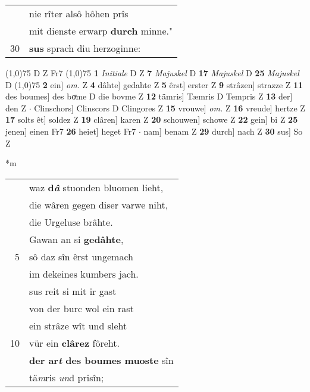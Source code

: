 \documentclass[8pt,a4paper,notitlepage]{article}
\begin{document}
\begin{table}[ht]
\begin{minipage}[t]{0.5\linewidth}
\begin{tabular}{rl}
 & nie rîter alsô hôhen prîs\\ 
 & mit dienste erwarp \textbf{durch} minne."\\ 
30 & \textbf{sus} sprach diu herzoginne:\\ 
\end{tabular}
\scriptsize
\line(1,0){75} \newline
D Z Fr7 \newline
\line(1,0){75} \newline
\textbf{1} \textit{Initiale} D Z  \textbf{7} \textit{Majuskel} D  \textbf{17} \textit{Majuskel} D  \textbf{25} \textit{Majuskel} D  \newline
\line(1,0){75} \newline
\textbf{2} ein] \textit{om.} Z \textbf{4} dâhte] gedahte Z \textbf{5} êrst] erster Z \textbf{9} strâzen] strazze Z \textbf{11} des boumes] des boͮme D die bovme Z \textbf{12} tämris] Tæmris D Tempris Z \textbf{13} der] den Z  $\cdot$ Clinschors] Clinscors D Clingores Z \textbf{15} vrouwe] \textit{om.} Z \textbf{16} vreude] hertze Z \textbf{17} solts êt] soldez Z \textbf{19} clâren] karen Z \textbf{20} schouwen] schowe Z \textbf{22} gein] bi Z \textbf{25} jenen] einen Fr7 \textbf{26} heiet] heget Fr7  $\cdot$ nam] benam Z \textbf{29} durch] nach Z \textbf{30} sus] So Z \newline
\end{minipage}
\hspace{0.5cm}
\begin{minipage}[t]{0.5\linewidth}
\small
\begin{center}*m
\end{center}
\begin{tabular}{rl}
 & waz \textbf{d\textit{â}} stuonden bluomen lieht,\\ 
 & die wâren gegen diser varwe niht,\\ 
 & die Urgeluse brâhte.\\ 
 & Gawan an si \textbf{gedâhte},\\ 
5 & sô daz sîn êrst ungemach\\ 
 & im dekeines kumbers jach.\\ 
 & sus reit si mit ir gast\\ 
 & von der burc wol ein rast\\ 
 & ein strâze wît und sleht\\ 
10 & vür ein \textbf{clârez} fôreht.\\ 
 & \textbf{der ar\textit{t} des boumes muoste} sîn\\ 
 & tä\textit{m}ris \textit{un}d prisîn;\\ 

\end{tabular}
\end{minipage}
\end{table}
\end{document}
